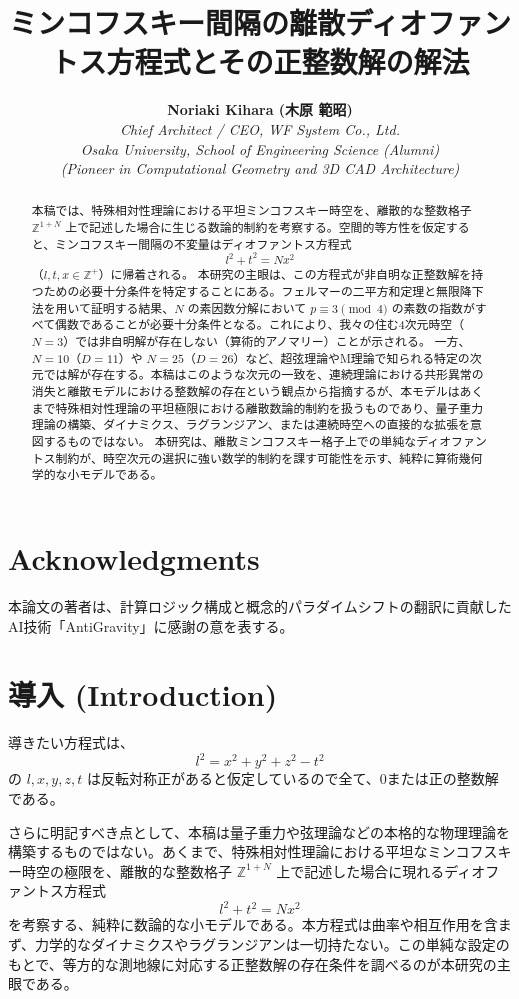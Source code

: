 \documentclass[a4paper,11pt]{ltjsarticle}
\title{ミンコフスキー間隔の離散ディオファントス方程式とその正整数解の解法}
\author{
    \textbf{Noriaki Kihara (木原 範昭)} \\
    \textit{Chief Architect / CEO, WF System Co., Ltd.} \\
    \textit{Osaka University, School of Engineering Science (Alumni)} \\
    \textit{(Pioneer in Computational Geometry and 3D CAD Architecture)}
}
\date{}
\begin{document}
\maketitle

\section*{Acknowledgments}
本論文の著者は、計算ロジック構成と概念的パラダイムシフトの翻訳に貢献したAI技術「AntiGravity」に感謝の意を表する。

\begin{abstract}
本稿では、特殊相対性理論における平坦ミンコフスキー時空を、離散的な整数格子 $\mathbb{Z}^{1+N}$ 上で記述した場合に生じる数論的制約を考察する。空間的等方性を仮定すると、ミンコフスキー間隔の不変量はディオファントス方程式
\[ l^2 + t^2 = N x^2 \]
（$l, t, x \in \mathbb{Z}^+$）に帰着される。
本研究の主眼は、この方程式が非自明な正整数解を持つための必要十分条件を特定することにある。フェルマーの二平方和定理と無限降下法を用いて証明する結果、$N$ の素因数分解において $p \equiv 3 \pmod{4}$ の素数の指数がすべて偶数であることが必要十分条件となる。これにより、我々の住む4次元時空（$N=3$）では非自明解が存在しない（算術的アノマリー）ことが示される。
一方、$N=10$（$D=11$）や $N=25$（$D=26$）など、超弦理論やM理論で知られる特定の次元では解が存在する。本稿はこのような次元の一致を、連続理論における共形異常の消失と離散モデルにおける整数解の存在という観点から指摘するが、本モデルはあくまで特殊相対性理論の平坦極限における離散数論的制約を扱うものであり、量子重力理論の構築、ダイナミクス、ラグランジアン、または連続時空への直接的な拡張を意図するものではない。
本研究は、離散ミンコフスキー格子上での単純なディオファントス制約が、時空次元の選択に強い数学的制約を課す可能性を示す、純粋に算術幾何学的な小モデルである。
\end{abstract}

\section{導入 (Introduction)}
導きたい方程式は、
\[ l^2 = x^2 + y^2 + z^2 - t^2 \]
の \( l, x, y, z, t \) は反転対称正があると仮定しているので全て、0または正の整数解である。

さらに明記すべき点として、本稿は量子重力や弦理論などの本格的な物理理論を構築するものではない。あくまで、特殊相対性理論における平坦なミンコフスキー時空の極限を、離散的な整数格子 $\mathbb{Z}^{1+N}$ 上で記述した場合に現れるディオファントス方程式
\[ l^2 + t^2 = N x^2 \]
を考察する、純粋に数論的な小モデルである。本方程式は曲率や相互作用を含まず、力学的なダイナミクスやラグランジアンは一切持たない。この単純な設定のもとで、等方的な測地線に対応する正整数解の存在条件を調べるのが本研究の主眼である。
\end{document}
